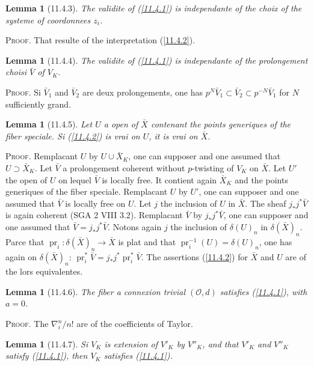 \documentclass[12pt,a4paper]{article}
\theoremstyle{plain}
\newtheorem{lemma}[theorem]{Lemma}
\theoremstyle{definition}
\theoremstyle{remark}
\DeclareMathOperator{\pr}{pr}
\begin{document}
\begin{lemma}[11.4.3]
The validite of (\ref{11.4.1}) is independante of the choix of the systeme of coordonnees $z_i$.
\end{lemma}

\textsc{Proof.} That resulte of the interpretation (\ref{11.4.2}).

\begin{lemma}[11.4.4]
The validite of (\ref{11.4.1}) is independante of the prolongement choisi $\bar{V}$ of $V_K$.
\end{lemma}

\textsc{Proof.} Si $\bar{V}_1$ and $\bar{V}_2$ are deux prolongements, one has $p^N \bar{V}_1 \subset \bar{V}_2 \subset p^{-N} \bar{V}_1$ for $N$ sufficiently grand.

\begin{lemma}[11.4.5]
Let $U$ a open of $\bar{X}$ contenant the points generiques of the fiber speciale. Si (\ref{11.4.2}) is vrai on $U$, it is vrai on $\bar{X}$.
\end{lemma}

\textsc{Proof.} Remplacant $U$ by $U \cup \bar{X}_K$, one can supposer and one assumed that $U \supset \bar{X}_K$. Let $\bar{V}$ a prolongement coherent without $p$-twisting of $V_K$ on $\bar{X}$. Let $U'$ the open of $U$ on lequel $\bar{V}$ is locally free. It contient again $\bar{X}_K$ and the points generiques of the fiber speciale. Remplacant $U$ by $U'$, one can supposer and one assumed that $\bar{V}$ is locally free on $U$. Let $j$ the inclusion of $U$ in $\bar{X}$. The sheaf $j_* j^* \bar{V}$ is again coherent (SGA 2 VIII 3.2). Remplacant $\bar{V}$ by $j_* j^* \bar{V}$, one can supposer and one assumed that $\bar{V} = j_* j^* \bar{V}$. Notons again $j$ the inclusion of $\delta(U)_n$ in $\delta(\bar{X})_n$. Parce that $\pr_i: \delta(\bar{X})_n \to \bar{X}$ is plat and that $\pr_i^{-1}(U) = \delta(U)_n$, one has again on $\delta(\bar{X})_n$: $\pr_i^* \bar{V} = j_* j^* \pr_i^* \bar{V}$. The assertions (\ref{11.4.2}) for $\bar{X}$ and $U$ are of the lors equivalentes.

\begin{lemma}[11.4.6]
The fiber a connexion trivial $(\mathcal{O}, d)$ satisfies (\ref{11.4.1}), with $a = 0$.
\end{lemma}

\textsc{Proof.} The $\nabla_i^n/n!$ are of the coefficients of Taylor.

\begin{lemma}[11.4.7]
Si $V_K$ is extension of $V'_K$ by $V''_K$, and that $V'_K$ and $V''_K$ satisfy (\ref{11.4.1}), then $V_K$ satisfies (\ref{11.4.1}).
\end{lemma}
\end{document}
